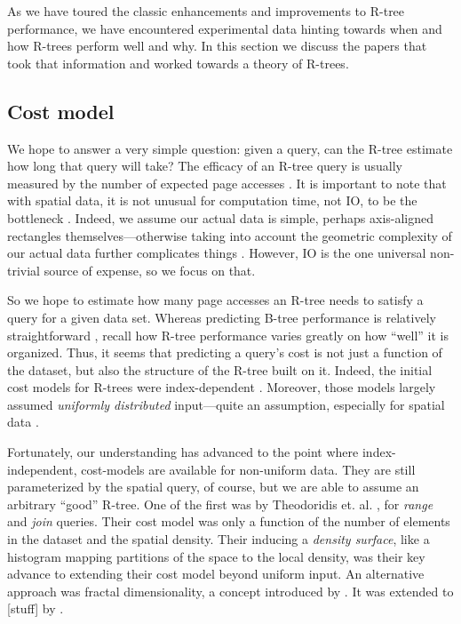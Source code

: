 As we have toured the classic enhancements and improvements to R-tree performance, we have encountered experimental data hinting towards when and how R-trees perform well and why.
In this section we discuss the papers that took that information and worked towards a theory of R-trees.

\subsection{Cost model}
We hope to answer a very simple question: given a query, can the R-tree estimate how long that query will take?
The efficacy of an R-tree query is usually measured by the number of expected page accesses \cite{.....}.
It is important to note that with spatial data, it is not unusual for computation time, not IO, to be the bottleneck \cite{.....}.
Indeed, we assume our actual data is simple, perhaps axis-aligned rectangles themselves---otherwise taking into account the geometric complexity of our actual data further complicates things \cite{aboulnaganaughton00}.
However, IO is the one universal non-trivial source of expense, so we focus on that.

So we hope to estimate how many page accesses an R-tree needs to satisfy a query for a given data set.
Whereas predicting B-tree performance is relatively straightforward \cite{....}, recall how R-tree performance varies greatly on how ``well'' it is organized.
Thus, it seems that predicting a query's cost is not just a function of the dataset, but also the structure of the R-tree built on it.
Indeed, the initial cost models for R-trees were index-dependent \cite{.....}.
Moreover, those models largely assumed \emph{uniformly distributed} input---quite an assumption, especially for spatial data \cite{...}.

Fortunately, our understanding has advanced to the point where index-independent, cost-models are available for non-uniform data.
They are still parameterized by the spatial query, of course, but we are able to assume an arbitrary ``good'' R-tree.
One of the first was by Theodoridis et. al. \cite{theodoridissellis96,theodoridisstefanakissellis00}, for \emph{range} and \emph{join} queries.
Their cost model was only a function of the number of elements in the dataset and the spatial density.
Their inducing a \emph{density surface}, like a histogram mapping partitions of the space to the local density, was their key advance to extending their cost model beyond uniform input.
An alternative approach was fractal dimensionality, a concept introduced by \cite{....}.
It was extended to [stuff] by \cite{...}.

